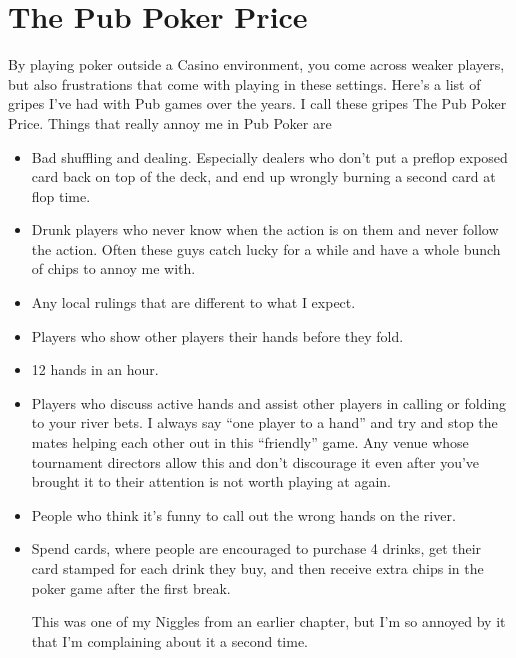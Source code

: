 \chapter{The Pub Poker Price}


By playing poker outside a Casino environment, you come across
weaker players, but also frustrations that come with playing
in these settings. Here's a list of gripes I've had with Pub
games over the years. I call these gripes The Pub Poker Price.
Things that really annoy me in Pub Poker are

\begin{itemize}

\item Bad shuffling and dealing. Especially dealers who don't
put a preflop exposed card back on top of the deck, and end
up wrongly burning a second card at flop time.

\item Drunk players who never know when the action is on them and
never follow the action. Often these guys catch lucky for a while
and have a whole bunch of chips to annoy me with.

\item Any local rulings that are different to what I expect.

\item Players who show other players their hands before they fold.

\item 12 hands in an hour.

\item Players who discuss active hands and assist other players in
calling or folding to your river bets. I always say ``one
player to a hand'' and try and stop the mates helping each other
out in this ``friendly'' game. Any venue whose tournament directors
allow this and don't discourage it even after you've brought
it to their attention is not worth playing at again.

\item People who think it's funny to call out the wrong hands on the river.

\item Spend cards, where people are encouraged to purchase 4 drinks,
get their card stamped for each drink they buy, and then receive extra
chips in the poker game after the first break.

This was one of my Niggles from an earlier chapter, but I'm so annoyed
by it that I'm complaining about it a second time.


\end{itemize}
